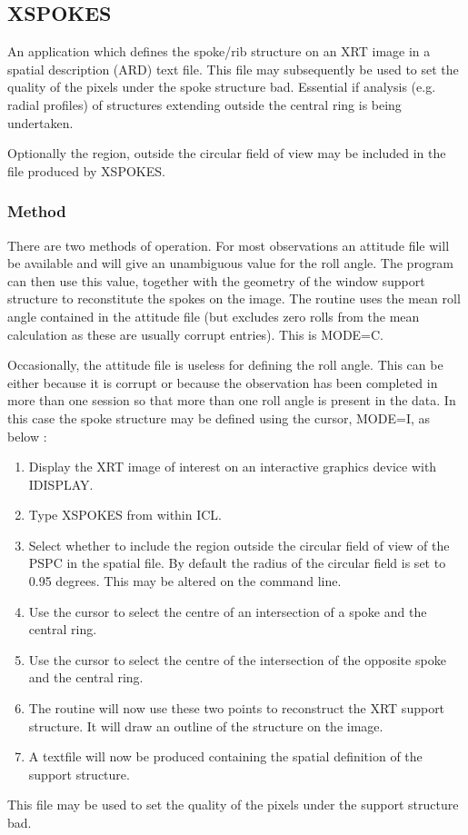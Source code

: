 \documentclass{book}
\renewcommand{\_}{{\tt\char'137}}     %
\begin{document}
\subsection{XSPOKES}
An application which defines the spoke/rib structure on an XRT
image in a spatial description (ARD) text file.
This file may subsequently be used to set the quality of the pixels under the
spoke structure bad. Essential if analysis (e.g. radial profiles)
of structures extending outside the central ring is being undertaken.

Optionally the region, outside the circular field of view may be
included in the file produced by XSPOKES.

\subsubsection{Method}
There are two methods of operation. For most observations an attitude
file will be available and will give an unambiguous value for the
roll angle. The program can then use this value, together with
the geometry of the window support structure to reconstitute the spokes
on the image. The routine uses the mean roll angle contained in the
attitude file (but excludes zero rolls from the mean calculation as
these are usually corrupt entries). This is MODE=C.

Occasionally, the attitude file is useless for defining
the roll angle. This can be either because it is corrupt or because
the observation has been completed in more than one session so that
more than one roll angle is present in the data. In this case the
spoke structure may be defined using the cursor, MODE=I, as below :

\begin{enumerate}
\item Display the XRT image of interest on an interactive graphics device
with IDISPLAY.
\item Type XSPOKES from within ICL.
\item Select whether to include the region outside the circular field
of view of the PSPC in the spatial file. By default
the radius of the circular field is set to 0.95 degrees. This
may be altered on the command line.
\item Use the cursor to select the centre of an intersection of
a spoke and the central ring.
\item Use the cursor to select the centre of the intersection of
the opposite spoke and the central ring.
\item The routine will now use these two points to reconstruct the
XRT support structure. It will draw an outline of the
structure on the image.
\item A textfile will now be produced containing the spatial
definition of the support structure.
\end{enumerate}
This file may be used to set the quality of the pixels
under the support structure bad.
\end{document}
